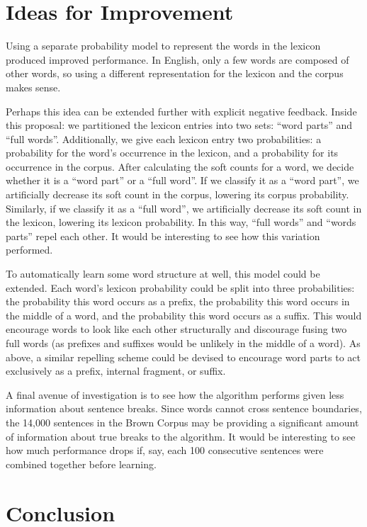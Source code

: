 \documentclass[11pt, oneside, fleqn]{article}
\begin{document}
  \section{Ideas for Improvement}

  Using a separate probability model to represent the words in the lexicon produced improved performance. In English, only a few words are composed of other words, so using a different representation for the lexicon and the corpus makes sense.
  
  Perhaps this idea can be extended further with explicit negative feedback. Inside this proposal: we partitioned the lexicon entries into two sets: ``word parts'' and ``full words''. Additionally, we give each lexicon entry two probabilities: a probability for the word's occurrence in the lexicon, and a probability for its occurrence in the corpus.  After calculating the soft counts for a word, we decide whether it is a ``word part'' or a ``full word''. If we classify it as a ``word part'', we artificially decrease its soft count in the corpus, lowering its corpus probability. Similarly, if we classify it as a ``full word'', we artificially decrease its soft count in the lexicon, lowering its lexicon probability. In this way, ``full words'' and ``words parts'' repel each other. It would be interesting to see how this variation performed.

	To automatically learn some word structure at well, this model could be extended. Each word's lexicon probability could be split into three probabilities: the probability this word occurs as a prefix, the probability this word occurs in the middle of a word, and the probability this word occurs as a suffix. This would encourage words to look like each other structurally and discourage fusing two full words (as prefixes and suffixes would be unlikely in the middle of a word). As above, a similar repelling scheme could be devised to encourage word parts to act exclusively as a prefix, internal fragment, or suffix.

	A final avenue of investigation is to see how the algorithm performs given less information about sentence breaks. Since words cannot cross sentence boundaries, the 14,000 sentences in the Brown Corpus may be providing a significant amount of information about true breaks to the algorithm. It would be interesting to see how much performance drops if, say, each 100 consecutive sentences were combined together before learning.

  \section{Conclusion}
\end{document}
